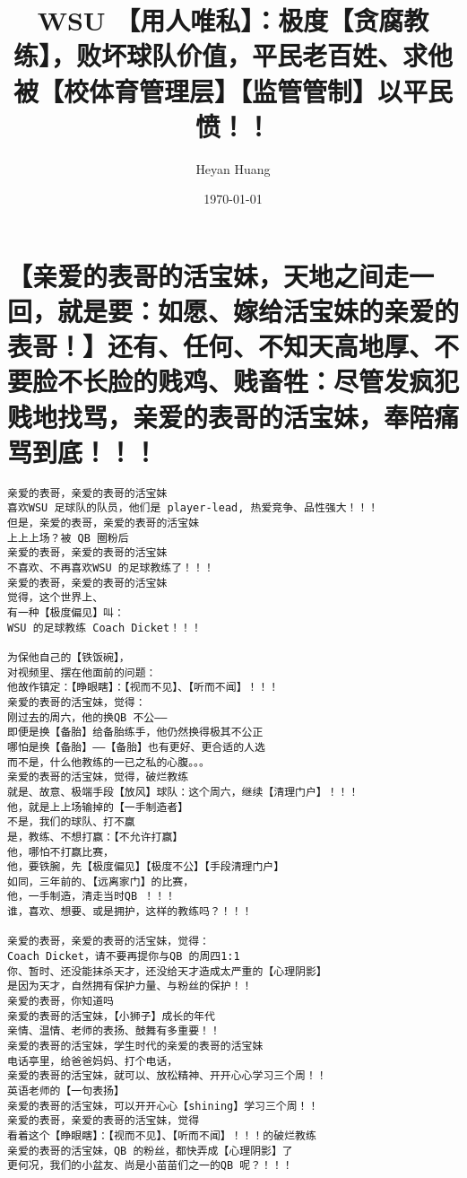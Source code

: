 \documentclass[9pt, b5paper]{article}
\author{Heyan Huang}
\date{\today}
\title{WSU 【用人唯私】：极度【贪腐教练】，败坏球队价值，平民老百姓、求他被【校体育管理层】【监管管制】以平民愤！！}
\begin{document}
\maketitle
\tableofcontents


\section{【亲爱的表哥的活宝妹，天地之间走一回，就是要：如愿、嫁给活宝妹的亲爱的表哥！】还有、任何、不知天高地厚、不要脸不长脸的贱鸡、贱畜牲：尽管发疯犯贱地找骂，亲爱的表哥的活宝妹，奉陪痛骂到底！！！}
\label{sec-1}
\begin{verbatim}
亲爱的表哥，亲爱的表哥的活宝妹
喜欢WSU 足球队的队员，他们是 player-lead, 热爱竞争、品性强大！！！
但是，亲爱的表哥，亲爱的表哥的活宝妹
上上上场？被 QB 圈粉后
亲爱的表哥，亲爱的表哥的活宝妹
不喜欢、不再喜欢WSU 的足球教练了！！！
亲爱的表哥，亲爱的表哥的活宝妹
觉得，这个世界上、
有一种【极度偏见】叫：
WSU 的足球教练 Coach Dicket！！！

为保他自己的【铁饭碗】，
对视频里、摆在他面前的问题：
他故作镇定：【睁眼瞎】：【视而不见】、【听而不闻】！！！
亲爱的表哥的活宝妹，觉得：
刚过去的周六，他的换QB 不公——
即便是换【备胎】给备胎练手，他仍然换得极其不公正
哪怕是换【备胎】——【备胎】也有更好、更合适的人选
而不是，什么他教练的一已之私的心腹。。。
亲爱的表哥的活宝妹，觉得，破烂教练
就是、故意、极端手段【放风】球队：这个周六，继续【清理门户】！！！
他，就是上上场输掉的【一手制造者】
不是，我们的球队、打不赢
是，教练、不想打赢：【不允许打赢】
他，哪怕不打赢比赛，
他，要铁腕，先【极度偏见】【极度不公】【手段清理门户】
如同，三年前的、【远离家门】的比赛，
他，一手制造，清走当时QB ！！！
谁，喜欢、想要、或是拥护，这样的教练吗？！！！

亲爱的表哥，亲爱的表哥的活宝妹，觉得：
Coach Dicket，请不要再提你与QB 的周四1:1
你、暂时、还没能抹杀天才，还没给天才造成太严重的【心理阴影】
是因为天才，自然拥有保护力量、与粉丝的保护！！
亲爱的表哥，你知道吗
亲爱的表哥的活宝妹，【小狮子】成长的年代
亲情、温情、老师的表扬、鼓舞有多重要！！
亲爱的表哥的活宝妹，学生时代的亲爱的表哥的活宝妹
电话亭里，给爸爸妈妈、打个电话，
亲爱的表哥的活宝妹，就可以、放松精神、开开心心学习三个周！！
英语老师的【一句表扬】
亲爱的表哥的活宝妹，可以开开心心【shining】学习三个周！！
亲爱的表哥，亲爱的表哥的活宝妹，觉得
看着这个【睁眼瞎】：【视而不见】、【听而不闻】！！！的破烂教练
亲爱的表哥的活宝妹，QB 的粉丝，都快弄成【心理阴影】了
更何况，我们的小盆友、尚是小苗苗们之一的QB 呢？！！！


\end{verbatim}
\end{document}
